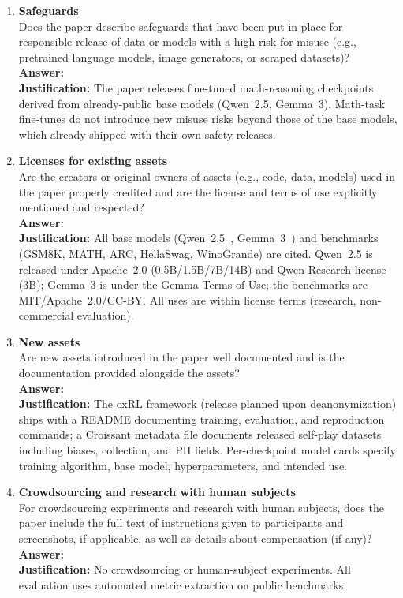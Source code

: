 \documentclass{article}
\begin{document}
\begin{enumerate}
\item {\bf Safeguards}\\
Does the paper describe safeguards that have been put in place for responsible release of data or models with a high risk for misuse (e.g., pretrained language models, image generators, or scraped datasets)?\\
\textbf{Answer:} \answerNA{}\\
\textbf{Justification:} The paper releases fine-tuned math-reasoning checkpoints derived from already-public base models (Qwen~2.5, Gemma~3). Math-task fine-tunes do not introduce new misuse risks beyond those of the base models, which already shipped with their own safety releases.

\item {\bf Licenses for existing assets}\\
Are the creators or original owners of assets (e.g., code, data, models) used in the paper properly credited and are the license and terms of use explicitly mentioned and respected?\\
\textbf{Answer:} \answerYes{}\\
\textbf{Justification:} All base models (Qwen~2.5~\citep{qwen2025qwen25}, Gemma~3~\citep{gemma3_2025}) and benchmarks (GSM8K, MATH, ARC, HellaSwag, WinoGrande) are cited. Qwen~2.5 is released under Apache~2.0 (0.5B/1.5B/7B/14B) and Qwen-Research license (3B); Gemma~3 is under the Gemma Terms of Use; the benchmarks are MIT/Apache~2.0/CC-BY. All uses are within license terms (research, non-commercial evaluation).

\item {\bf New assets}\\
Are new assets introduced in the paper well documented and is the documentation provided alongside the assets?\\
\textbf{Answer:} \answerYes{}\\
\textbf{Justification:} The oxRL framework (release planned upon deanonymization) ships with a README documenting training, evaluation, and reproduction commands; a Croissant metadata file documents released self-play datasets including biases, collection, and PII fields. Per-checkpoint model cards specify training algorithm, base model, hyperparameters, and intended use.

\item {\bf Crowdsourcing and research with human subjects}\\
For crowdsourcing experiments and research with human subjects, does the paper include the full text of instructions given to participants and screenshots, if applicable, as well as details about compensation (if any)?\\
\textbf{Answer:} \answerNA{}\\
\textbf{Justification:} No crowdsourcing or human-subject experiments. All evaluation uses automated metric extraction on public benchmarks.


\end{enumerate}
\end{document}
